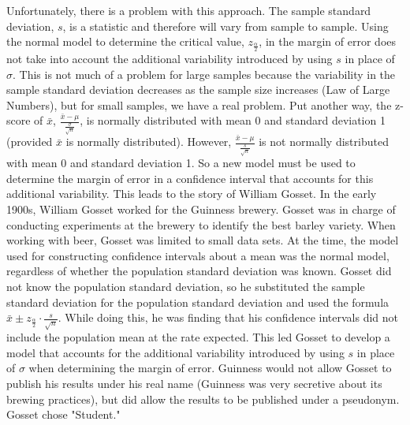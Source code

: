 \documentclass{report}
\begin{document}
     \bigbreak \noindent 
     Unfortunately, there is a problem with this approach. The sample standard deviation, \( s \), is a statistic and therefore will vary from sample to sample. Using the normal model to determine the critical value, \( z_{\frac{\alpha}{2}} \), in the margin of error does not take into account the additional variability introduced by using \( s \) in place of \( \sigma \). This is not much of a problem for large samples because the variability in the sample standard deviation decreases as the sample size increases (Law of Large Numbers), but for small samples, we have a real problem.
     \bigbreak \noindent 
    Put another way, the z-score of \( \bar{x} \), \( \frac{\bar{x} - \mu}{\frac{\sigma}{\sqrt{n}}} \), is normally distributed with mean 0 and standard deviation 1 (provided \( \bar{x} \) is normally distributed). However, \( \frac{\bar{x} - \mu}{\frac{s}{\sqrt{n}}} \) is not normally distributed with mean 0 and standard deviation 1. So a new model must be used to determine the margin of error in a confidence interval that accounts for this additional variability. This leads to the story of William Gosset.
    \bigbreak \noindent 
    In the early 1900s, William Gosset worked for the Guinness brewery. Gosset was in charge of conducting experiments at the brewery to identify the best barley variety. When working with beer, Gosset was limited to small data sets. At the time, the model used for constructing confidence intervals about a mean was the normal model, regardless of whether the population standard deviation was known. Gosset did not know the population standard deviation, so he substituted the sample standard deviation for the population standard deviation and used the formula \(\bar{x} \pm z_{\frac{\alpha}{2}} \cdot \frac{s}{\sqrt{n}}\). While doing this, he was finding that his confidence intervals did not include the population mean at the rate expected. This led Gosset to develop a model that accounts for the additional variability introduced by using \( s \) in place of \( \sigma \) when determining the margin of error. Guinness would not allow Gosset to publish his results under his real name (Guinness was very secretive about its brewing practices), but did allow the results to be published under a pseudonym. Gosset chose "Student."
\end{document}
